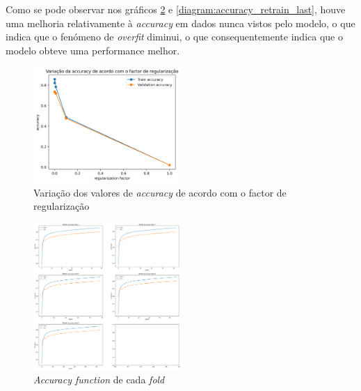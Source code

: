 Como se pode observar nos gráficos \ref{diagram:accuracy_fold_last}  e \ref{diagram:accuracy_retrain_last}, houve uma melhoria relativamente à \textit{accuracy} em dados nunca vistos pelo modelo, o que indica que o fenómeno de \textit{overfit} diminui, o que consequentemente indica que o modelo obteve uma performance melhor.



\begin{figure}[t]
\begin{center}
\includegraphics[width=0.5\textwidth,keepaspectratio]{figures/r_Factor.png}
\caption{Variação dos valores de \textit{accuracy} de acordo com o factor de regularização}
\label{diagram:reg_factor}
\centering
\end{center}
\end{figure}


\begin{figure}[t]
\begin{center}
\includegraphics[width=0.5\textwidth,keepaspectratio]{figures/merged_fold_graphics_last.png}
\caption{\textit{Accuracy function} de cada \textit{fold}}
\label{diagram:accuracy_fold_last}
\centering
\end{center}
\end{figure}




